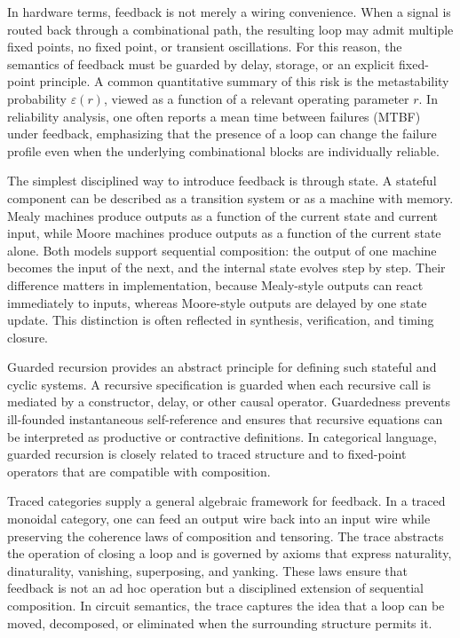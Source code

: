 \documentclass[11pt]{article}
\begin{document}
In hardware terms, feedback is not merely a wiring convenience. When a signal is routed back through a combinational path, the resulting loop may admit multiple fixed points, no fixed point, or transient oscillations. For this reason, the semantics of feedback must be guarded by delay, storage, or an explicit fixed-point principle. A common quantitative summary of this risk is the metastability probability \(\varepsilon(r)\), viewed as a function of a relevant operating parameter \(r\). In reliability analysis, one often reports a mean time between failures (MTBF) under feedback, emphasizing that the presence of a loop can change the failure profile even when the underlying combinational blocks are individually reliable.

The simplest disciplined way to introduce feedback is through state. A stateful component can be described as a transition system or as a machine with memory. Mealy machines produce outputs as a function of the current state and current input, while Moore machines produce outputs as a function of the current state alone. Both models support sequential composition: the output of one machine becomes the input of the next, and the internal state evolves step by step. Their difference matters in implementation, because Mealy-style outputs can react immediately to inputs, whereas Moore-style outputs are delayed by one state update. This distinction is often reflected in synthesis, verification, and timing closure.

Guarded recursion provides an abstract principle for defining such stateful and cyclic systems. A recursive specification is guarded when each recursive call is mediated by a constructor, delay, or other causal operator. Guardedness prevents ill-founded instantaneous self-reference and ensures that recursive equations can be interpreted as productive or contractive definitions. In categorical language, guarded recursion is closely related to traced structure and to fixed-point operators that are compatible with composition.

Traced categories supply a general algebraic framework for feedback. In a traced monoidal category, one can feed an output wire back into an input wire while preserving the coherence laws of composition and tensoring. The trace abstracts the operation of closing a loop and is governed by axioms that express naturality, dinaturality, vanishing, superposing, and yanking. These laws ensure that feedback is not an ad hoc operation but a disciplined extension of sequential composition. In circuit semantics, the trace captures the idea that a loop can be moved, decomposed, or eliminated when the surrounding structure permits it.
\end{document}
